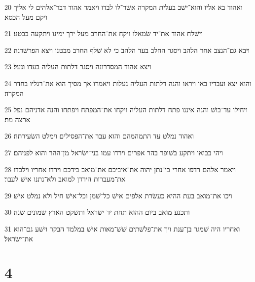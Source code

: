 \par 20 ואהוד בא אליו והוא־ישׁב בעלית המקרה אשׁר־לו לבדו ויאמר אהוד דבר־אלהים לי אליך ויקם מעל הכסא׃
\par 21 וישׁלח אהוד את־יד שׂמאלו ויקח את־החרב מעל ירך ימינו ויתקעה בבטנו׃
\par 22 ויבא גם־הנצב אחר הלהב ויסגר החלב בעד הלהב כי לא שׁלף החרב מבטנו ויצא הפרשׁדנה׃
\par 23 ויצא אהוד המסדרונה ויסגר דלתות העליה בעדו ונעל׃
\par 24 והוא יצא ועבדיו באו ויראו והנה דלתות העליה נעלות ויאמרו אך מסיך הוא את־רגליו בחדר המקרה׃
\par 25 ויחילו עד־בושׁ והנה איננו פתח דלתות העליה ויקחו את־המפתח ויפתחו והנה אדניהם נפל ארצה מת׃
\par 26 ואהוד נמלט עד התמהמהם והוא עבר את־הפסילים וימלט השׂעירתה׃
\par 27 ויהי בבואו ויתקע בשׁופר בהר אפרים וירדו עמו בני־ישׂראל מן־ההר והוא לפניהם׃
\par 28 ויאמר אלהם רדפו אחרי כי־נתן יהוה את־איביכם את־מואב בידכם וירדו אחריו וילכדו את־מעברות הירדן למואב ולא־נתנו אישׁ לעבר׃
\par 29 ויכו את־מואב בעת ההיא כעשׂרת אלפים אישׁ כל־שׁמן וכל־אישׁ חיל ולא נמלט אישׁ׃
\par 30 ותכנע מואב ביום ההוא תחת יד ישׂראל ותשׁקט הארץ שׁמונים שׁנה׃
\par 31 ואחריו היה שׁמגר בן־ענת ויך את־פלשׁתים שׁשׁ־מאות אישׁ במלמד הבקר וישׁע גם־הוא את־ישׂראל׃

\chapter{4}

